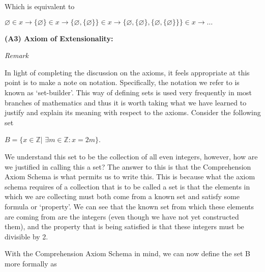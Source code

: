 \documentclass[12pt, a4paper]{article}
\begin{document}
\begin{description}
\vspace{4mm}

Which is equivalent to\par

\vspace{4mm}

\centerline{$\varnothing\in x\rightarrow\{\varnothing\}\in x\rightarrow\{\varnothing,\{\varnothing\}\}\in x\rightarrow\{\varnothing,\{\varnothing\},\{\varnothing,\{\varnothing\}\}\}\in x\rightarrow\dots$}

\item\textbf{(A3) Axiom of Extensionality: }

\end{description}



\newpage

\noindent\large\textit{Remark}\normalsize\par

\vspace{4mm}

\noindent In light of completing the discussion on the axioms, it feels appropriate at this point is to make a note on notation. Specifically, the notation we refer to is known as `set-builder'. This way of defining sets is used very frequently in most branches of mathematics and thus it is worth taking what we have learned to justify and explain its meaning with respect to the axioms. Consider the following set\par

\vspace{4mm}

\centerline{$B=\{x\in\mathbb{Z}$\hspace{2mm}$|$\hspace{1mm} $\exists m\in\mathbb{Z}\colon x=2m\}$.}

\vspace{4mm}

\noindent We understand this set to be the collection of all even integers, however, how are we justified in calling this a set? The answer to this is that the Comprehension Axiom Schema is what permits us to write this. This is because what the axiom schema requires of a collection that is to be called a set is that the elements in which we are collecting must both come from a known set and satisfy some formula or `property'. We can see that the known set from which these elements are coming from are the integers (even though we have not yet constructed them), and the property that is being satisfied is that these integers must be divisible by 2.\par
With the Comprehension Axiom Schema in mind, we can now define the set B more formally as\par
\end{document}
